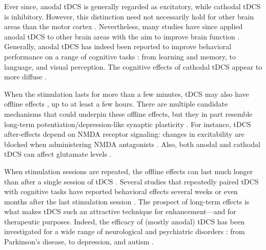 \documentclass[11pt,english,]{memoir}
\begin{document}
Ever since, anodal tDCS is generally regarded as excitatory, while cathodal tDCS is inhibitory. However, this distinction need not necessarily hold for other brain areas than the motor cortex \autocites{Bestmann2017}{Parkin2015}. Nevertheless, many studies have since applied anodal tDCS to other brain areas with the aim to improve brain function \autocite{Grossman2018}. Generally, anodal tDCS has indeed been reported to improve behavioral performance on a range of cognitive tasks \autocites{Coffman2014}{Santarnecchi2015}: from learning and memory, to language, and visual perception. The cognitive effects of cathodal tDCS appear to more diffuse \autocite{Jacobson2012}.

When the stimulation lasts for more than a few minutes, tDCS may also have offline effects \autocites{Bindman1964}{Nitsche2001}, up to at least a few hours. There are multiple candidate mechanisms that could underpin these offline effects, but they in part resemble long-term potentiation/depression-like synaptic plasticity \autocite{Bikson2019}. For instance, tDCS after-effects depend on NMDA receptor signaling: changes in excitability are blocked when administering NMDA antagonists \autocites{Liebetanz2002}{Nitsche2003}. Also, both anodal and cathodal tDCS can affect glutamate levels \autocites{Clark2011}{Stagg2009}.

When stimulation sessions are repeated, the offline effects can last much longer than after a single session of tDCS \autocite{Monte-Silva2013}. Several studies that repeatedly paired tDCS with cognitive tasks have reported behavioral effects several weeks or even months after the last stimulation session \autocites[e.g.,][]{Filmer2016}{Looi2016a}{Snowball2013}[but see][]{Nilsson2017}. The prospect of long-term effects is what makes tDCS such an attractive technique for enhancement---and for therapeutic purposes. Indeed, the efficacy of (mostly anodal) tDCS has been investigated for a wide range of neurological and psychiatric disorders \autocite{Lefaucheur2016}: from Parkinson's disease, to depression, and autism \autocite{Lefaucheur2016a}.
\end{document}
